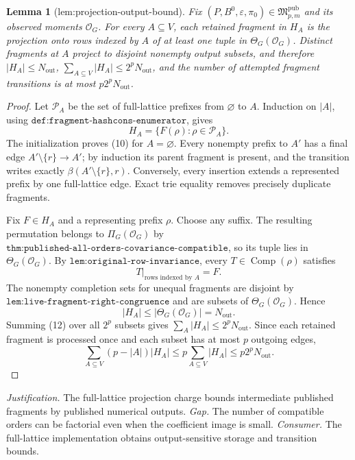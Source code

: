 \documentclass{article}
\newtheorem{lemma}{Lemma}
\begin{document}
\begin{lemma}[lem:projection-output-bound]\label{lem:projection-output-bound}
Fix \((P,B^0,\varepsilon,\pi_0)\in\mathfrak M_{p,m}^{\mathrm{pub}}\) and its observed moments \(\mathcal O_G\). For every \(A\subseteq V\), each retained fragment in \(H_A\) is the projection onto rows indexed by \(A\) of at least one tuple in \(\Theta_G(\mathcal O_G)\). Distinct fragments at \(A\) project to disjoint nonempty output subsets, and therefore \(|H_A|\le N_{\mathrm{out}}\), \(\sum_{A\subseteq V}|H_A|\le2^pN_{\mathrm{out}}\), and the number of attempted fragment transitions is at most \(p2^pN_{\mathrm{out}}\).
\end{lemma}
\begin{proof}
Let \(\mathcal P_A\) be the set of full-lattice prefixes from \(\varnothing\) to \(A\).  Induction on \(|A|\), using \(\texttt{def:fragment-hashcons-enumerator}\), gives
\[
 H_A=\{F(\rho):\rho\in\mathcal P_A\}.
 \tag{10}
\]
The initialization proves (10) for \(A=\varnothing\).  Every nonempty prefix to \(A'\) has a final edge \(A'\setminus\{r\}\to A'\); by induction its parent fragment is present, and the transition writes exactly \(\beta(A'\setminus\{r\},r)\).  Conversely, every insertion extends a represented prefix by one full-lattice edge.  Exact trie equality removes precisely duplicate fragments.

Fix \(F\in H_A\) and a representing prefix \(\rho\).  Choose any suffix.  The resulting permutation belongs to \(\Pi_G(\mathcal O_G)\) by \(\texttt{thm:published-all-orders-covariance-compatible}\), so its tuple lies in \(\Theta_G(\mathcal O_G)\).  By \(\texttt{lem:original-row-invariance}\), every \(T\in\operatorname{Comp}(\rho)\) satisfies
\[
 T\big|_{\text{rows indexed by }A}=F.
 \tag{11}
\]
The nonempty completion sets for unequal fragments are disjoint by \(\texttt{lem:live-fragment-right-congruence}\) and are subsets of \(\Theta_G(\mathcal O_G)\).  Hence
\[
 |H_A|\le|\Theta_G(\mathcal O_G)|=N_{\mathrm{out}}.
 \tag{12}
\]
Summing (12) over all \(2^p\) subsets gives \(\sum_A|H_A|\le2^pN_{\mathrm{out}}\).  Since each retained fragment is processed once and each subset has at most \(p\) outgoing edges,
\[
 \sum_{A\subseteq V}(p-|A|)|H_A|
 \le p\sum_{A\subseteq V}|H_A|
 \le p2^pN_{\mathrm{out}}.
\]
\end{proof}
\par\smallskip\noindent \textit{Justification.} The full-lattice projection charge bounds intermediate published fragments by published numerical outputs. \textit{Gap.} The number of compatible orders can be factorial even when the coefficient image is small. \textit{Consumer.} The full-lattice implementation obtains output-sensitive storage and transition bounds.
\end{document}
